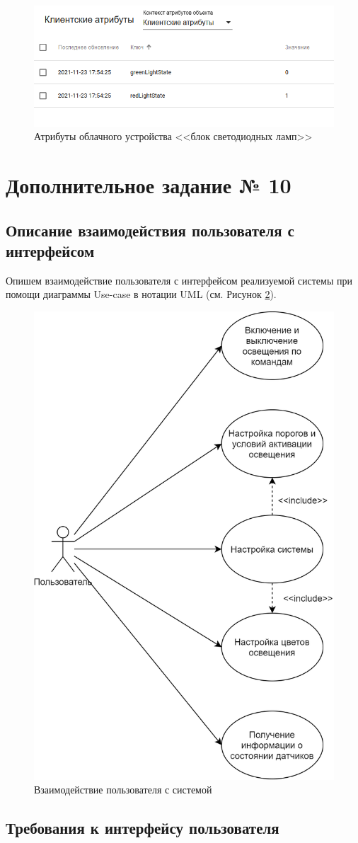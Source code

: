 \documentclass[a4paper,14pt]{extarticle}
\begin{document}
\begin{figure}[h!]
	\centering
	\includegraphics[width=0.6\linewidth]{images/attr-2}
	\caption{Атрибуты облачного устройства <<блок светодиодных ламп>>}
	\label{fig:attr-2}
\end{figure}


\section{Дополнительное задание № 10}

\subsection{Описание взаимодействия пользователя с интерфейсом}
Опишем взаимодействие пользователя с интерфейсом реализуемой системы при помощи диаграммы Use-case в нотации UML (см. Рисунок \ref{fig:usecase-10}). 

\begin{figure}[h!]
	\centering
	\includegraphics[width=0.4\linewidth]{images/usecase-10}
	\caption{Взаимодействие пользователя с системой}
	\label{fig:usecase-10}
\end{figure}


\subsection{Требования к интерфейсу пользователя}
\end{document}

